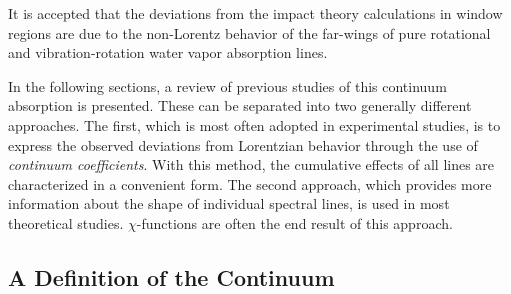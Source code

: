 \documentclass[11pt]{article}
\begin{document}
It is accepted that the deviations from the impact theory calculations in 
window regions are due to the non-Lorentz behavior of the 
far-wings of pure rotational and vibration-rotation water vapor 
absorption lines.  

In the following sections, a review of previous studies of this continuum 
absorption is presented.  These can be separated into two generally 
different approaches.  The first, which is most often adopted in 
experimental
studies, is to express the observed deviations from Lorentzian behavior
through the use of {\em continuum coefficients}.  With this method, the
cumulative effects of all lines are characterized in a convenient form.
The second approach, which provides more information about the shape of 
individual spectral lines, is used in most theoretical studies.
$\chi$-functions are often the end result of this approach.

\subsection{A Definition of the Continuum}
\end{document}
